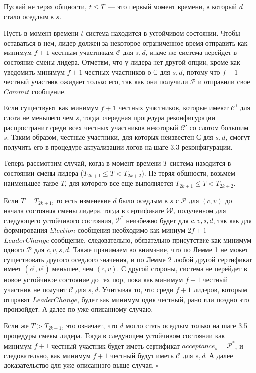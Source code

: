 Пускай не теряя общности, $t \le T$~--- это первый момент времени, в который $d$ стало оседлым в $s$.

Пусть в момент времени $t$ система находится в устойчивом состоянии. Чтобы оставаться в нем, лидер  должен за некоторое ограниченное время отправить как минимум $f+1$ честным участникам $\mathcal{C}$ для $s, d$, иначе же система перейдет в состояние смены лидера. Отметим, что у лидера нет другой опции, кроме как уведомить минимум $f+1$ честных участников о $\mathcal{С}$ для $s, d$, потому что $f+1$ честный участник ожидает только его, так как они получили $\mathcal{P}$ и отправили свое $Commit$ сообщение.

Если существуют как минимум $f+1$ честных участников, которые имеют $\mathcal{C}^i$ для слота не меньшего чем $s$, тогда очередная процедура реконфигурации распространит среди всех честных участников некоторый $\mathcal{C}'$ со слотом большим $s$. Таким образом, честные участники, для которых неизвестен $\mathcal{С}$ для $s, d$, смогут получить его в процедуре актуализации логов на шаге 3.3 реконфигурации.

Теперь рассмотрим случай, когда в момент времени $T$ система находится в состоянии смены лидера ($T_{2k+1} \le T < T_{2k+2}$). Не теряя общности, возьмем наименьшее такое $T$, для которого все еще выполняется $T_{2k+1} \le T < T_{2k+2}$.

Если $T= T_{2k+1}$, то есть изменение $d$ было оседлым в $s$ с $\mathcal{P}$ для $(c, v)$ до начала состояния смены лидера, тогда в сертификате $\mathcal{W}$, полученном для следующего устойчивого состояния, $\mathcal{P}^{*}$ неизбежно будет для $c, v, s, d$, так как для формирования $Election$ сообщения необходимо как миниум $2f+1$ $LeaderChange$ сообщение, следовательно, обязательно присутствие как минимум одного $\mathcal{P}$ для $c, v, s, d$. Также принимаем во внимание, что по Лемме 1 не может существовать другого оседлого значения, и по Лемме 2 любой другой сертификат имеет $(c^j, v^j)$ меньшее, чем $(c, v)$. С другой стороны, система не перейдет в новое устойчивое состояние до тех пор, пока как минимум $f+1$ честный участник не получит $\mathcal{C}$ для $s, d$. Учитывая то, что среди $f+1$ лидеров, которым отправят $LeaderChange$, будет как минимум один честный, рано или поздно это произойдет. А далее по уже описанному случаю.

Если же  $T > T_{2k+1}$, это означает, что $d$ могло стать оседлым только на шаге 3.5 процедуры смены лидера. Тогда в следующем устойчивом состоянии как минимум $f+1$ честный участник будет иметь сертификат $acceptance_s = \mathcal{P}^{*}$, и следовательно, как минимум $f+1$ честный будут иметь $\mathcal{C}$ для $s, d$. А далее доказательство для уже описанного выше случая.
$\square$
\vspace{10pt}

